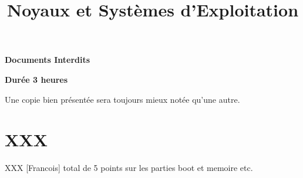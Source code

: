 %
%
%
%
%
%

%
%

%
%

\def\path{../../..}

%
%



%
%

\title{Noyaux et Syst\`emes d'Exploitation}

%
%

\rhead{}

%
%



%
%

\maketitle

%
%

\indentation{}

%
%

\begin{center}

\textbf{Documents Interdits}

\textbf{Dur\'ee 3 heures}

\scriptsize{Une copie bien pr\'esent\'ee sera toujours mieux not\'ee
            qu'une autre.}

\end{center}

%
%

%
%

\section{XXX
         {\hfill{} }}

XXX [Francois] total de 5 points sur les parties boot et memoire etc.

